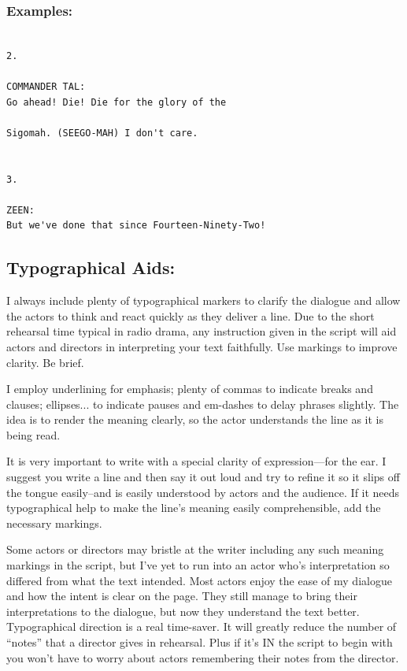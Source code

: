 \documentclass[openleft,oneside,showtrims]{memoir}
\begin{document}
\subsubsection*{Examples:}
\label{sec:org4fffa60}

\lstset{language=fountain,label= ,caption= ,captionpos=b,numbers=none}
\begin{lstlisting}

2.

COMMANDER TAL:
Go ahead! Die! Die for the glory of the
  
Sigomah. (SEEGO-MAH) I don't care.


3.

ZEEN:
But we've done that since Fourteen-Ninety-Two!

\end{lstlisting}

\subsection{Typographical Aids:}
\label{sec:org45f09ef}
I always include plenty of typographical markers to clarify the dialogue and allow the actors to think and react quickly as they deliver a line. Due to the short rehearsal time typical in radio drama, any instruction given in the script will aid actors and directors in interpreting your text faithfully. Use markings to improve clarity. Be brief.

I employ underlining for emphasis; plenty of commas to indicate breaks and clauses; ellipses... to indicate pauses and em-dashes to delay phrases slightly. The idea is to render the meaning clearly, so the actor understands the line as it is being read.

It is very important to write with a special clarity of expression—for the ear. I suggest you write a line and then say it out loud and try to refine it so it slips off the tongue easily--and is easily understood by actors and the audience. If it needs typographical help to make the line's meaning easily comprehensible, add the necessary markings.

Some actors or directors may bristle at the writer including any such meaning markings in the script, but I've yet to run into an actor who's interpretation so differed from what the text intended. Most actors enjoy the ease of my dialogue and how the intent is clear on the page. They still manage to bring their interpretations to the dialogue, but now they understand the text better. Typographical direction is a real time-saver. It will greatly reduce the number of  ``notes'' that a director gives in rehearsal. Plus if it's IN the script to begin with you won't have to worry about actors remembering their notes from the director.
\end{document}
